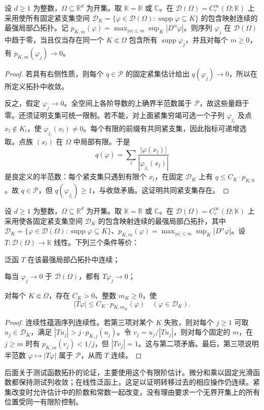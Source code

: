 \begin{proposition}\label{b1:prop:test-sequence-convergence}
设 \(d\geq1\) 为整数，\(\Omega\subseteq\mathbb R^d\) 为开集。取 \(\mathbb K=\mathbb R\) 或 \(\mathbb C\)。在 \(\mathcal D(\Omega)=C_c^\infty(\Omega;\mathbb K)\) 上采用使所有固定紧支集空间 \(\mathcal D_K=\{\varphi\in\mathcal D(\Omega):\operatorname{supp}\varphi\subseteq K\}\) 的包含映射连续的最强局部凸拓扑。记 \(p_{K,m}(\varphi)=\max_{|\alpha|\leq m}\sup_K|D^\alpha\varphi|\)。则序列 \(\varphi_j\) 在 \(\mathcal D(\Omega)\) 中趋于零，当且仅当存在同一个 \(K\Subset\Omega\) 包含所有 \(\operatorname{supp}\varphi_j\)，并且对每个 \(m\geq0\)，有 \(p_{K,m}(\varphi_j)\to0\)。
\end{proposition}
\begin{proof}
若具有右侧性质，则每个 \(q\in\mathscr P\) 的固定紧集估计给出 \(q(\varphi_j)\to0\)，所以在所定义拓扑中收敛。

反之，假定 \(\varphi_j\to0\)。全空间上各阶导数的上确界半范数属于 \(\mathscr P\)，故这些量趋于零。还须证明支集可统一限制。若不能，对上面紧集穷竭可选一个子列 \(\varphi_{j_l}\) 及点 \(x_l\notin K_l\)，使 \(\varphi_{j_l}(x_l)\ne0\)。每个有限的前缀有共同紧支集，因此指标可递增选取。点族 \((x_l)\) 在 \(\Omega\) 中局部有限。于是
\[
 q(\varphi)=\sum_l\frac{|\varphi(x_l)|}{|\varphi_{j_l}(x_l)|}
\]
是良定义的半范数：每个紧支集只遇到有限个 \(x_l\)，在固定 \(\mathcal D_K\) 上有 \(q\leq C_K\cdot p_{K,0}\)。故 \(q\in\mathscr P\)，但 \(q(\varphi_{j_l})\geq1\)，与收敛矛盾。这证明共同紧支集存在。
\end{proof}

\begin{proposition}\label{b1:prop:test-functional-continuity}
设 \(d\geq1\) 为整数，\(\Omega\subseteq\mathbb R^d\) 为开集。取 \(\mathbb K=\mathbb R\) 或 \(\mathbb C\)。在 \(\mathcal D(\Omega)=C_c^\infty(\Omega;\mathbb K)\) 上采用使各固定紧支集空间 \(\mathcal D_K\) 的包含映射连续的最强局部凸拓扑，其中 \(\mathcal D_K=\{\varphi\in\mathcal D(\Omega):\operatorname{supp}\varphi\subseteq K\}\)、\(p_{K,m}(\varphi)=\max_{|\alpha|\leq m}\sup_K|D^\alpha\varphi|\)。设 \(T:\mathcal D(\Omega)\rightarrow\mathbb K\) 线性。下列三个条件等价：
\begin{equivalences}
\item\label{b1:item:test-functional-topological}泛函 \(T\) 在该最强局部凸拓扑中连续；
\item\label{b1:item:test-functional-sequential}每当 \(\varphi_j\to0\) 于 \(\mathcal D(\Omega)\)，都有 \(T\varphi_j\to0\)；
\item\label{b1:item:test-functional-order}对每个 \(K\Subset\Omega\)，存在 \(C_K>0\)、整数 \(m_K\geq0\)，使
\[
 |T\varphi|\leq C_K\cdot p_{K,m_K}(\varphi)\quad(\varphi\in\mathcal D_K).
\]
\end{equivalences}
\end{proposition}
\begin{proof}
连续性蕴涵序列连续性。若第三项对某个 \(K\) 失败，则对每个 \(j\geq1\) 可取 \(u_j\in\mathcal D_K\)，满足 \(|Tu_j|>j\cdot p_{K,j}(u_j)\)。令 \(v_j=u_j/|Tu_j|\)，则对每个固定的 \(m\)，在 \(j\geq m\) 时有 \(p_{K,m}(v_j)<1/j\)，但 \(|Tv_j|=1\)。这与第二项矛盾。最后，第三项说明半范数 \(\varphi\mapsto|T\varphi|\) 属于 \(\mathscr P\)，从而 \(T\) 连续。
\end{proof}

后面关于测试函数拓扑的论证，主要使用这个有限阶估计。微分和乘以固定光滑函数都保持测试列收敛；在线性泛函上，这足以证明转移过去的相应操作仍连续。紧集改变时允许估计中的阶数和常数一起改变，没有理由要求一个无界开集上的所有位置受同一有限阶控制。
